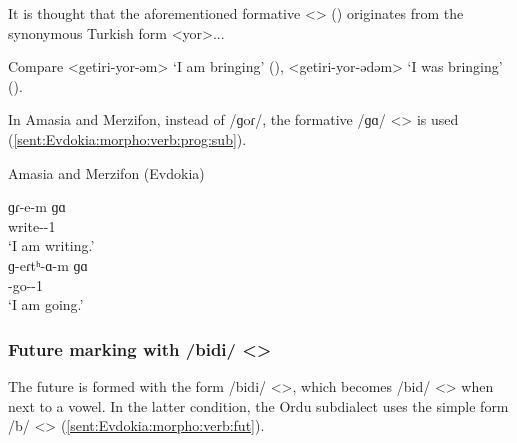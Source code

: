 It is thought that the aforementioned formative <> () originates from the synonymous Turkish form <yor>...

\begin{adjarianpage}\label{page:234}\end{adjarianpage}%


Compare <getiri-yor-əm> `I am bringing' (), <getiri-yor-ədəm> `I was bringing' (). 




In Amasia and Merzifon, instead of /ɡoɾ/, the formative /ɡɑ/ <> is used (\ref{sent:Evdokia:morpho:verb:prog:sub}).

\begin{exe}
	\ex Amasia and Merzifon (Evdokia) \label{sent:Evdokia:morpho:verb:prog:sub} 
	\begin{xlist}
		\ex \gll ɡɾ-e-m ɡɑ \\
		write-{\thgloss}-1{\sg} {\prog} \\
		\trans `I am writing.'\\
		\ex \gll ɡ-eɾtʰ-ɑ-m ɡɑ \\
		{\ind}-go-{\thgloss}-1{\sg} {\prog} \\
		\trans `I am going.'\\
		
	\end{xlist}
\end{exe}

\subsubsection{Future marking with /bidi/ <>}
The future is formed with the form /bidi/ <>, which becomes /bid/ <> when next to a vowel. In the latter condition, the Ordu subdialect uses the simple form /b/ <> (\ref{sent:Evdokia:morpho:verb:fut}). 






